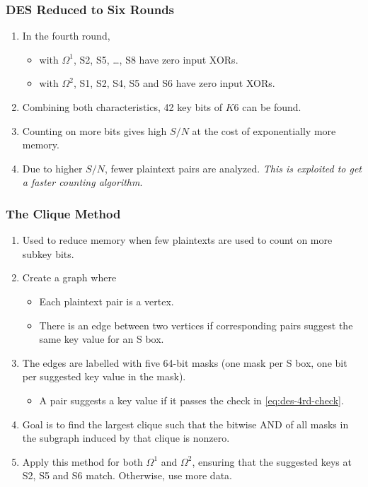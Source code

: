 \documentclass{beamer}
\begin{document}
	\begin{frame}
		\frametitle{DES Reduced to Six Rounds}
		\begin{enumerate}
			\item<1-> In the fourth round,
			\begin{itemize}
				\item with \(\Omega^1\), S2, S5, \dots, S8 have zero input XORs.
				\item with \(\Omega^2\), S1, S2, S4, S5 and S6 have zero input
				XORs.
			\end{itemize}
			\item<2-> Combining both characteristics, 42 key bits of \(K6\) can
			be found.
			\item<3-> Counting on more bits gives high \(S/N\) at the cost of
			exponentially more memory.
			\item<4-> Due to higher \(S/N\), fewer plaintext pairs are analyzed.
			\emph{This is exploited to get a faster counting algorithm}.
		\end{enumerate}
	\end{frame}

	\begin{frame}
		\frametitle{The Clique Method}
		\begin{enumerate}
			\item<1-> Used to reduce memory when few plaintexts are used to
			count on more subkey bits.
			\item<2-> Create a graph where
			\begin{itemize}
				\item Each plaintext pair is a vertex.
				\item There is an edge between two vertices if corresponding
				pairs suggest the same key value for an S box.
			\end{itemize}
			\item<3-> The edges are labelled with five 64-bit masks (one mask
			per S box, one bit per suggested key value in the mask).
			\begin{itemize}
				\item A pair suggests a key value if it passes the check in
				\eqref{eq:des-4rd-check}.
			\end{itemize}
			\item<4-> Goal is to find the largest clique such that the bitwise
			AND of all masks in the subgraph induced by that clique is nonzero.
			\item<5-> Apply this method for both \(\Omega^1\) and \(\Omega^2\),
			ensuring that the suggested keys at S2, S5 and S6 match. Otherwise,
			use more data.
		\end{enumerate}
	\end{frame}
\end{document}
